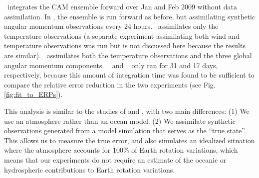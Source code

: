 \NODA ~integrates the CAM ensemble forward over Jan and Feb 2009 without data assimilation. 
In \ERPALL, the ensemble is run forward as before, but assimilating synthetic angular momentum observations every 24 hours.
\RST ~assimilates only the temperature observations (a separate experiment assimilating both wind and temperature observations was run but is not discussed here because the results are similar).
\ERPRST ~assimilates both the temperature observations and the three global angular momentum components.
\RST~ and \ERPRST~ only ran for 31 and 17 days, respectively, because this amount of integration time was found to be sufficient to compare the relative error reduction in the two experiments (see Fig. \ref{fig:fit_to_ERPs}). 

This analysis is similar to the studies of \citet{Saynisch2010,Saynisch2011} and \citet{Saynisch2012}, with two main differences:
(1) We use an atmosphere rather than an ocean model.
(2) We assimilate synthetic observations generated from a model simulation that serves as the ``true state''. 
This allows us to measure the true error, and 
also simulates an idealized situation where the atmosphere accounts for 100\% of Earth rotation variations, which means that our experiments do not require an estimate of the oceanic or hydrospheric contributions to Earth rotation variations.

